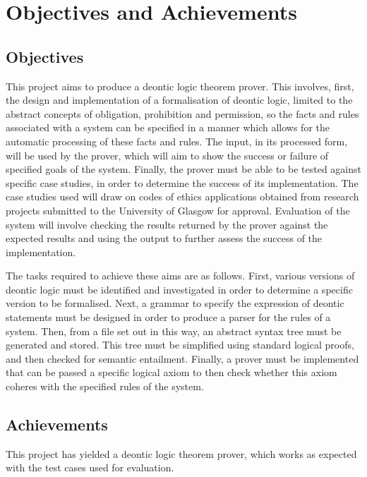 \documentclass{l4proj}
\begin{document}
\section{Objectives and Achievements} %
\subsection{Objectives}
This project aims to produce a deontic logic theorem prover. This involves, first, the design and implementation of a formalisation of deontic logic, limited to the abstract concepts of obligation, prohibition and permission, so the facts and rules associated with a system can be specified in a manner which allows for the automatic processing of these facts and rules. The input, in its processed form, will be used by the prover, which will aim to show the success or failure of specified goals of the system. Finally, the prover must be able to be tested against specific case studies, in order to determine the success of its implementation. The case studies used will draw on codes of ethics applications obtained from research projects submitted to the University of Glasgow for approval. Evaluation of the system will involve checking the results returned by the prover against the expected results and using the output to further assess the success of the implementation. 

The tasks required to achieve these aims are as follows. First, various versions of deontic logic must be identified and investigated in order to determine a specific version to be formalised. Next, a grammar to specify the expression of deontic statements must be designed in order to produce a parser for the rules of a system. Then, from a file set out in this way, an abstract syntax tree must be generated and stored. This tree must be simplified using standard logical proofs, and then checked for semantic entailment. Finally, a prover must be implemented that can be passed a specific logical axiom to then check whether this axiom coheres with the specified rules of the system.

\subsection{Achievements}
This project has yielded a deontic logic theorem prover, which works as expected with the test cases used for evaluation. 
\end{document}
